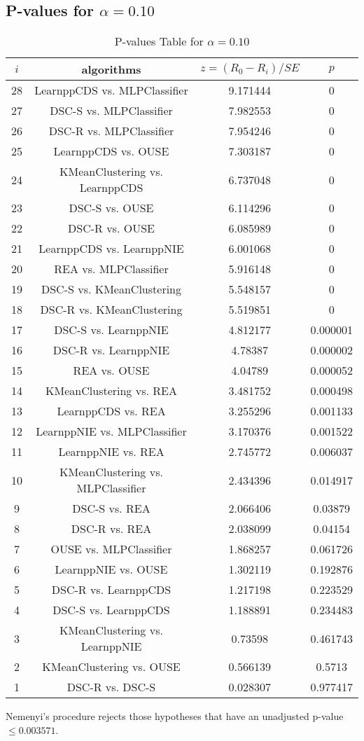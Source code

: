 \documentclass[a4paper,10pt]{article}
\begin{document}
\begin{landscape}
\pagebreak

\subsection{P-values for $\alpha=0.10$}

\begin{table}[!htp]
\centering\scriptsize
\begin{tabular}{cccc}
$i$&algorithms&$z=(R_0 - R_i)/SE$&$p$\\
\hline28&LearnppCDS vs. MLPClassifier&9.171444&0\\
27&DSC-S vs. MLPClassifier&7.982553&0\\
26&DSC-R vs. MLPClassifier&7.954246&0\\
25&LearnppCDS vs. OUSE&7.303187&0\\
24&KMeanClustering vs. LearnppCDS&6.737048&0\\
23&DSC-S vs. OUSE&6.114296&0\\
22&DSC-R vs. OUSE&6.085989&0\\
21&LearnppCDS vs. LearnppNIE&6.001068&0\\
20&REA vs. MLPClassifier&5.916148&0\\
19&DSC-S vs. KMeanClustering&5.548157&0\\
18&DSC-R vs. KMeanClustering&5.519851&0\\
17&DSC-S vs. LearnppNIE&4.812177&0.000001\\
16&DSC-R vs. LearnppNIE&4.78387&0.000002\\
15&REA vs. OUSE&4.04789&0.000052\\
14&KMeanClustering vs. REA&3.481752&0.000498\\
13&LearnppCDS vs. REA&3.255296&0.001133\\
12&LearnppNIE vs. MLPClassifier&3.170376&0.001522\\
11&LearnppNIE vs. REA&2.745772&0.006037\\
10&KMeanClustering vs. MLPClassifier&2.434396&0.014917\\
9&DSC-S vs. REA&2.066406&0.03879\\
8&DSC-R vs. REA&2.038099&0.04154\\
7&OUSE vs. MLPClassifier&1.868257&0.061726\\
6&LearnppNIE vs. OUSE&1.302119&0.192876\\
5&DSC-R vs. LearnppCDS&1.217198&0.223529\\
4&DSC-S vs. LearnppCDS&1.188891&0.234483\\
3&KMeanClustering vs. LearnppNIE&0.73598&0.461743\\
2&KMeanClustering vs. OUSE&0.566139&0.5713\\
1&DSC-R vs. DSC-S&0.028307&0.977417\\
\hline
\end{tabular}
\caption{P-values Table for $\alpha=0.10$}
\end{table}Nemenyi's procedure rejects those hypotheses that have an unadjusted p-value $\le0.003571$.


\end{landscape}
\end{document}
